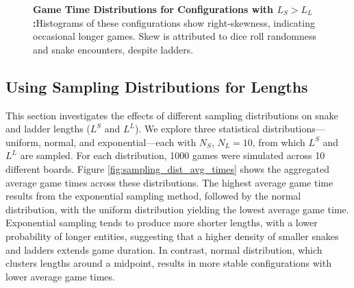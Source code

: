 \begin{figure}[ht]
	\centering
	\linebreak
	\caption{\textbf{Game Time Distributions for Configurations with $L_S > L_L$:}Histograms of these configurations show right-skewness, indicating occasional longer games. Skew is attributed to dice roll randomness and snake encounters, despite ladders.}
	\label{fig:fixed_lengths_dist}
\end{figure}


\subsection{Using Sampling Distributions for Lengths}

This section investigates the effects of different sampling distributions on snake and ladder lengths ($L^S$ and $L^L$). We explore three statistical distributions—uniform, normal, and exponential—each with $N_S$, $N_L = 10$, from which $L^S$ and $L^L$ are sampled. For each distribution, 1000 games were simulated across 10 different boards. Figure \ref{fig:sampling_dist_avg_times} shows the aggregated average game times across these distributions. The highest average game time results from the exponential sampling method, followed by the normal distribution, with the uniform distribution yielding the lowest average game time. Exponential sampling tends to produce more shorter lengths, with a lower probability of longer entities, suggesting that a higher density of smaller snakes and ladders extends game duration. In contrast, normal distribution, which clusters lengths around a midpoint, results in more stable configurations with lower average game times.

